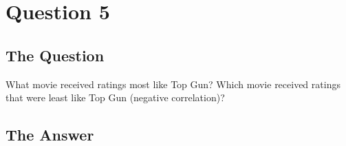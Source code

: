 \section{Question 5}

\subsection{The Question}

\begin{flushleft}

 What movie received ratings most like Top Gun? Which movie
received ratings that were least like Top Gun (negative correlation)?


\end{flushleft}
\subsection{The Answer}


